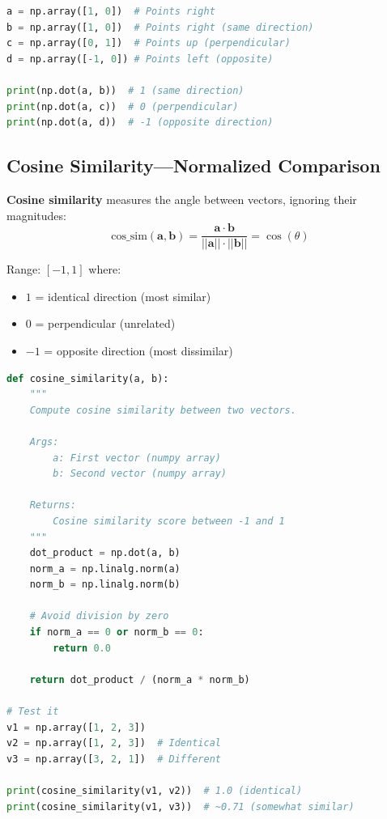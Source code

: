 \documentclass[12pt,a4paper]{article}
\begin{document}
\begin{lstlisting}[language=Python,caption={Dot product}]
a = np.array([1, 0])  # Points right
b = np.array([1, 0])  # Points right (same direction)
c = np.array([0, 1])  # Points up (perpendicular)
d = np.array([-1, 0]) # Points left (opposite)

print(np.dot(a, b))  # 1 (same direction)
print(np.dot(a, c))  # 0 (perpendicular)
print(np.dot(a, d))  # -1 (opposite direction)
\end{lstlisting}

\subsection{Cosine Similarity---Normalized Comparison}

\begin{mathbox}
\textbf{Cosine similarity} measures the angle between vectors, ignoring their magnitudes:
\[
\text{cos\_sim}(\mathbf{a}, \mathbf{b}) = \frac{\mathbf{a} \cdot \mathbf{b}}{||\mathbf{a}|| \cdot ||\mathbf{b}||} = \cos(\theta)
\]

Range: $[-1, 1]$ where:
\begin{itemize}
    \item $1$ = identical direction (most similar)
    \item $0$ = perpendicular (unrelated)
    \item $-1$ = opposite direction (most dissimilar)
\end{itemize}
\end{mathbox}

\begin{lstlisting}[language=Python,caption={Cosine similarity implementation}]
def cosine_similarity(a, b):
    """
    Compute cosine similarity between two vectors.

    Args:
        a: First vector (numpy array)
        b: Second vector (numpy array)

    Returns:
        Cosine similarity score between -1 and 1
    """
    dot_product = np.dot(a, b)
    norm_a = np.linalg.norm(a)
    norm_b = np.linalg.norm(b)

    # Avoid division by zero
    if norm_a == 0 or norm_b == 0:
        return 0.0

    return dot_product / (norm_a * norm_b)

# Test it
v1 = np.array([1, 2, 3])
v2 = np.array([1, 2, 3])  # Identical
v3 = np.array([3, 2, 1])  # Different

print(cosine_similarity(v1, v2))  # 1.0 (identical)
print(cosine_similarity(v1, v3))  # ~0.71 (somewhat similar)
\end{lstlisting}
\end{document}
